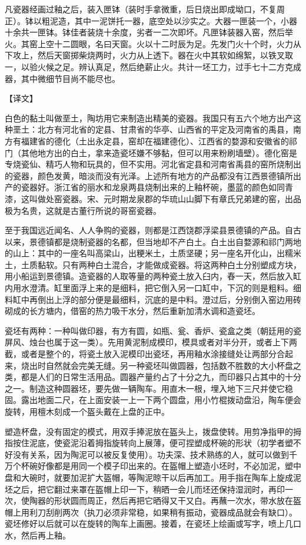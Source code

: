 \documentclass[12pt,UTF8]{ctexbook}
\begin{document}
凡瓷器经画过釉之后，装入匣钵（装时手拿微重，后日烧出即成坳口，不复周正）。钵以粗泥造，其中一泥饼托一器，底空处以沙实之。大器一匣装一个，小器十余共一匣钵。钵佳者装烧十余度，劣者一二次即坏。凡匣钵装器入窑，然后举火。其窑上空十二圆眼，名曰天窗。火以十二时辰为足。先发门火十个时，火力从下攻上，然后天窗掷柴烧两时，火力从上透下。器在火中其软如绵絮，以铁叉取一，以验火候之足。辨认真足，然后绝薪止火。共计一坯工力，过手七十二方克成器，其中微细节目尚不能尽也。

【译文】

白色的黏土叫做垩土，陶坊用它来制造出精美的瓷器。我国只有五六个地方出产这种垩土：北方有河北省的定县、甘肃省的华亭、山西省的平定及河南省的禹县，南方有福建省的德化（土出永定县，窑却在福建德化）、江西省的婺源和安徽省的祁门（其他地方出的白土，拿来造瓷坯嫌不够黏，但可以用来粉刷墙壁）。德化窑是专烧瓷仙、精巧人物和玩具的，但不实用。河北省定县和河南省禹县的窑所烧制出的瓷器，颜色发黄，暗淡而没有光泽。上述所有地方的产品都没有江西景德镇所出产的瓷器好。浙江省的丽水和龙泉两县烧制出来的上釉杯碗，墨蓝的颜色如同青漆，这叫做处窑瓷器。宋、元时期龙泉郡的华琉山山脚下有章氏兄弟建的窑，出品极为名贵，这就是古董行所说的哥窑瓷器。

至于我国远近闻名、人人争购的瓷器，则都是江西饶郡浮梁县景德镇的产品。自古以来，景德镇都是烧制瓷器的名都，但当地却不产白土。白土出自婺源和祁门两地的山上：其中的一座名叫高梁山，出粳米土，土质坚硬；另一座名开化山，出糯米土，土质黏软。只有两种白土混合，才能做成瓷器。将这两种白土分别塑成方块，用小船运到景德镇。造瓷器的人取等量的两种瓷土放入臼内，舂一天，然后放入缸内用水澄清。缸里面浮上来的是细料，把它倒入另一口缸中，下沉的则是粗料。细料缸中再倒出上浮的部分便是最细料，沉底的是中料。澄过后，分别倒入窑边用砖砌成的长方塘内，借窑的热力吸干水分，然后重新加清水调和造瓷坯。

瓷坯有两种：一种叫做印器，有方有圆，如瓶、瓮、香炉、瓷盒之类（朝廷用的瓷屏风、烛台也属于这一类）。先用黄泥制成模印，模具或者对半分开，或者上下两截，或者是整个的，将瓷土放入泥模印出瓷坯，再用釉水涂接缝处让两部分合起来，烧出时自然就会完美无缝。另一种瓷坯叫做圆器，包括数不胜数的大小杯盘之类，都是人们的日常生活用品。圆器产量约占了十分之九，而印器只占其中的十分之一。制造这种圆器坯，要先做一辆陶车。用直木一根，埋入地下三尺并使它稳固。露出地面二尺，在上面安装一上一下两个圆盘，用小竹棍拨动盘沿，陶车便会旋转，用檀木刻成一个盔头戴在上盘的正中。

塑造杯盘，没有固定的模式，用双手捧泥放在盔头上，拨盘使转。用剪净指甲的拇指按住泥底，使瓷泥沿着拇指旋转向上展薄，便可捏塑成杯碗的形状（初学者塑不好没有关系，因为陶泥可以被反复使用）。功夫深、技术熟练的人，就可以做到千万个杯碗好像都是用同一个模子印出来的。在盔帽上塑造小坯时，不必加泥，塑中盘和大碗时，就要加泥扩大盔帽，等陶泥晾干以后再加工。用手指在陶车上旋成泥坯之后，把它翻过来罩在盔帽上印一下，稍晒一会儿而坯还保持湿润时，再印一次，使陶器的形状圆而周正，然后再把它晒得又干又白。再蘸一次水，带水放在盔帽上用利刀刮削两次（执刀必须非常稳，如果稍有振动，瓷器成品就会有缺口）。瓷坯修好以后就可以在旋转的陶车上画圈。接着，在瓷坯上绘画或写字，喷上几口水，然后再上釉。
\end{document}
